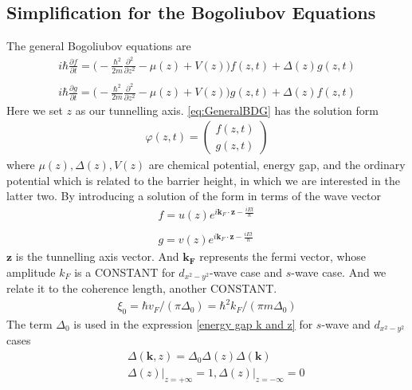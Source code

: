 \subsection{Simplification for the Bogoliubov Equations}
The general Bogoliubov equations are 
\begin{eqnarray}\label{eq:GeneralBDG}
i\hbar\frac{\partial f}{\partial t} = \Big(-\frac{\hbar^2}{2m}\frac{\partial^2}{\partial {z^2}}-\mu(z)+V(z)\Big)f(z,t)+\Delta(z)g(z,t)\nonumber\\
\\
i\hbar\frac{\partial g}{\partial t} = \Big(-\frac{\hbar^2}{2m}\frac{\partial^2}{\partial {z^2}}-\mu(z)+V(z)\Big)g(z,t)+\Delta(z)f(z,t)\nonumber
\end{eqnarray}
Here we set $z$ as our tunnelling axis.
\eqref{eq:GeneralBDG} has the solution form 
\begin{eqnarray}
\varphi(z,t)=
\left(\begin{array}{c}
f(z,t)\\
g(z,t)
\end{array}\right)
\end{eqnarray}
where $\mu(z),\Delta(z),V(z)$ are chemical potential, energy gap, and the ordinary potential which is related to the barrier height, in which we are interested in the latter two.
By introducing a solution of the form in terms of the wave vector
\begin{eqnarray}\label{eq:wavefront}
f=u(z)e^{i\mathbf{k}_F\cdot\mathbf{z}-\frac{iEt}{\hbar}}\nonumber\\
\\
g=v(z)e^{i\mathbf{k}_F\cdot\mathbf{z}-\frac{iEt}{\hbar}}\nonumber\
\end{eqnarray}
$\mathbf{z}$ is the tunnelling axis vector. And $\mathbf{k_F}$ represents the fermi vector, whose amplitude $k_F$ is a CONSTANT for $d_{x^2-y^2}$-wave case and $s$-wave case. And we relate it to the coherence length, another CONSTANT.
\begin{eqnarray}\label{fermi vector}
\xi_0=\hbar v_F/(\pi\Delta_0)=\hbar^2k_F/(\pi m \Delta_0)
\end{eqnarray}
The term $\Delta_0$ is used in the expression \eqref{energy gap k and z} for $s$-wave and $d_{x^2-y^2}$ cases
\begin{eqnarray}\label{energy gap k and z}
&&\Delta(\mathbf{k},z)=\Delta_0\Delta(z)\Delta(\mathbf{k})\nonumber\\
&&\left.\Delta(z)\right|_{z=+\infty}=1,\left.\Delta(z)\right|_{z=-\infty}=0
\end{eqnarray}
